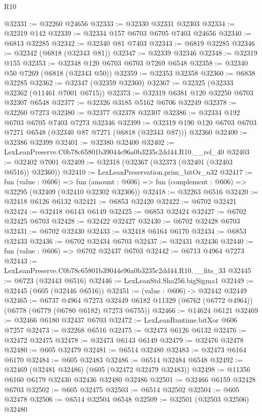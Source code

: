 \begin{lexlean}{R10}
\begin{coremodule}
@32331 := @32260 @24656
@32333 := @32330 @32331 @32303
@32334 := @32319 @142
@32339 := @32334 @157 @6703 @6705 @7403 @24656
@32340 := @6813 @32285
@32342 := @32340 @81 @7403
@32343 := @6819 @32285
@32346 := @32342 (@6818 (@32343 @81))
@32347 := @32339 @32346
@32348 := @32319 @155
@32353 := @32348 @120 @6703 @6703 @7269 @6548
@32358 := @32340 @50 @7269 (@6818 (@32343 @50))
@32359 := @32353 @32358
@32360 := @6838 @32285
@32362 := @32347 (@32359 @32360)
@32367 := @32325 (@32333 @32362 (@11461 @7001 @6715))
@32373 := @32319 @6381 @120 @32250 @6703 @32307 @6548
@32377 := @32326 @3185 @5162 @6706 @32249
@32378 := @32260 @7273
@32380 := @32377 @32378 @32307
@32386 := @32334 @192 @6703 @6705 @7403 @7273 @32346
@32399 := @32319 @190 @120 @6703 @6703 @7271 @6548 (@32340 @87 @7271 (@6818 (@32343 @87))) @32360
@32400 := @32386 @32399
@32401 := @32380 @32400
@32402 := LexLeanPreserve.C0b78c65801b39044e96a0b3235c2dd44.R10.__rel_40
@32403 := @32402 @7001
@32409 := @32318 (@32367 (@32373 (@32401 (@32403 @6516)) @32360))
@32410 := LexLeanPreservation.prim_bitOr_u32
@32417 := fun (value : @606) =>
  fun (amount : @606) => fun (complement : @606) => @32295 (@32409 (@32410 @32302 @32306))
@32418 := @32263 @6516
@32420 := @32418 @6126 @6132
@32421 := @6853 @32420
@32422 := @6702 @32421
@32424 := @32418 @6143 @6149
@32425 := @6853 @32424
@32427 := @6702 @32425 @6703
@32428 := @32422 @32427
@32430 := @6702 @32428 @6703
@32431 := @6702 @32430
@32433 := @32418 @6164 @6170
@32434 := @6853 @32433
@32436 := @6702 @32434 @6703
@32437 := @32431 @32436
@32440 := fun (value : @606) => @6702 @32437 @6703
@32442 := @6713 @4964 @7273
@32443 := LexLeanPreserve.C0b78c65801b39044e96a0b3235c2dd44.R10.__fits_33
@32445 := @6723 (@32443 @6516)
@32446 := LexLeanStd.Sha256.bigSigma1
@32449 := @32445 (@605 (@32446 @6516))
@32451 := (value : @606) -> @32442 @32449
@32465 := @6737
    @4964
    @7273
    @32449
    @6182
    @11329
    (@6762 (@6772 @4964))
    (@6778 (@6779 (@6780 @6182) @7273 @6755))
@32466 := @14624 @6121
@32469 := @32466 @6180 @32437 @6703
@32472 := LexLeanRuntime.bitXor @606 @7257
@32473 := @32268 @6516
@32475 := @32473 @6126 @6132
@32476 := @32472 @32475
@32478 := @32473 @6143 @6149
@32479 := @32476 @32478
@32480 := @605 @32479
@32481 := @6514 @32480
@32483 := @32473 @6164 @6170
@32484 := @605 @32483
@32486 := @6514 @32484 @6548
@32492 := @32469 (@32481 @32486) (@605 (@32472 @32479 @32483))
@32498 := @11356 @6160 @6179 @32430 @32436 @32480 @32486
@32501 := @32466 @6159 @32428 @6703
@32502 := @605 @32475
@32503 := @6514 @32502
@32504 := @605 @32478
@32506 := @6514 @32504 @6548
@32509 := @32501 (@32503 @32506) @32480

\end{coremodule}
\end{lexlean}
